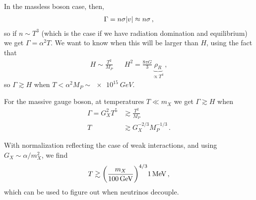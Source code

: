 \documentclass[main.tex]{subfiles}
\begin{document}
In the massless boson case, then, 
%
\begin{align}
\Gamma = n \sigma \abs{v} \approx n \sigma 
\,,
\end{align}
%
so if \(n \sim T^3\) (which is the case if we have radiation domination and equilibrium) we get \(\Gamma = \alpha^2 T\). We want to know when this will be larger than \(H\), using the fact that 
%
\begin{align}
H \sim \frac{T^2}{M_P} && H^2 = \frac{8 \pi G}{3} \underbrace{\rho _R}_{\propto T^{4}}
\,,
\end{align}
%
so \(\Gamma \gtrsim H\) when \(T < \alpha^2 M_P \sim \SI{e15}{GeV}\). 

For the massive gauge boson, at temperatures \(T \ll m_X\) we get \(\Gamma \gtrsim H\) when 
%
\begin{align}\label{eq:massive-gauge-boson-cross-section}
\Gamma = G_X^2 T^{5} &\gtrsim \frac{T^2}{M_P}  \\
T &\gtrsim G_X^{-2/3} M_P^{-1/3}
\,.
\end{align}

With normalization reflecting the case of weak interactions, and using \(G_X \sim \alpha / m_X^2\), we find 
%
\begin{align}
T \gtrsim \qty(\frac{m_X}{\SI{100}{GeV}})^{4/3} \SI{1}{MeV}
\,,
\end{align}
%
which can be used to figure out when neutrinos decouple. 
\end{document}
